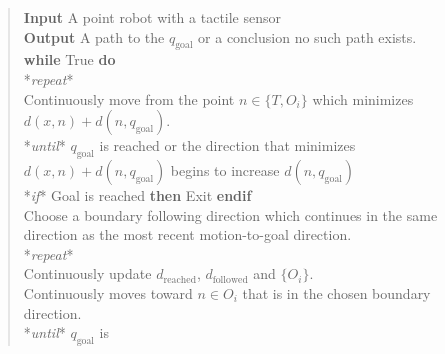 \begin{quote}
\textbf{Input} A point robot with a tactile sensor\\
\textbf{Output} A path to the \(q_{\text{goal}}\) or a conclusion no
such path exists.\\
\textbf{while} True \textbf{do}\\
\hspace*{0.333em}\hspace*{0.333em}*\emph{repeat}*\\
\hspace*{0.333em}\hspace*{0.333em}\hspace*{0.333em}\hspace*{0.333em}Continuously
move from the point \(n\in \{ T, O_i\}\) which minimizes
\(d(x,n)+d(n,q_{\text{goal}})\).\\
\hspace*{0.333em}\hspace*{0.333em}*\emph{until}* \(q_{\text{goal}}\) is
reached or the direction that minimizes \(d(x,n)+d(n,q_{\text{goal}})\)
begins to increase \(d(n,q_{\text{goal}})\)\\
\hspace*{0.333em}\hspace*{0.333em}*\emph{if}* Goal is reached
\textbf{then} Exit \textbf{endif}\\
\hspace*{0.333em}\hspace*{0.333em}Choose a boundary following direction
which continues in the same direction as the most recent motion-to-goal
direction.\\
\hspace*{0.333em}\hspace*{0.333em}*\emph{repeat}*\\
\hspace*{0.333em}\hspace*{0.333em}\hspace*{0.333em}\hspace*{0.333em}Continuously
update \(d_\text{reached}\), \(d_\text{followed}\) and \(\{O_i\}\).\\
\hspace*{0.333em}\hspace*{0.333em}\hspace*{0.333em}\hspace*{0.333em}Continuously
moves toward \(n\in O_i\) that is in the chosen boundary direction.\\
\hspace*{0.333em}\hspace*{0.333em}*\emph{until}* \(q_{\text{goal}}\) is

\end{quote}
